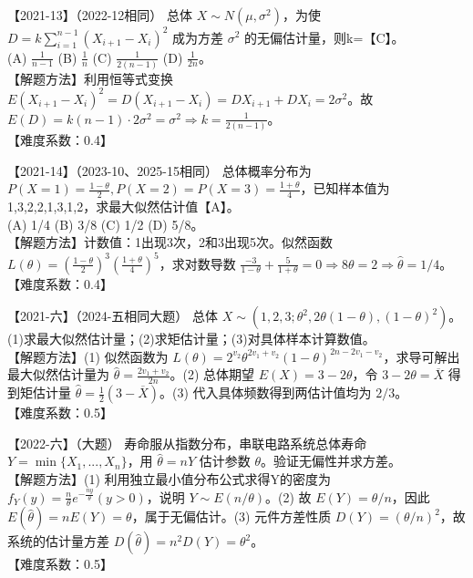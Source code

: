 \documentclass[zihao=4, a4paper, fontset=mac]{ctexart}
\begin{document}
【2021-13】（2022-12相同） 总体 $X\sim N(\mu,\sigma^2)$，为使 $D=k\sum_{i=1}^{n-1}(X_{i+1}-X_i)^2$ 成为方差 $\sigma^2$ 的无偏估计量，则k=【C】。\\
(A) $\frac{1}{n-1}$ \quad (B) $\frac{1}{n}$ \quad (C) $\frac{1}{2(n-1)}$ \quad (D) $\frac{1}{2n}$。\\
【解题方法】利用恒等式变换 $E(X_{i+1}-X_i)^2 = D(X_{i+1}-X_i) = DX_{i+1}+DX_i = 2\sigma^2$。故 $E(D)=k(n-1)\cdot2\sigma^2 = \sigma^2 \Rightarrow k=\frac{1}{2(n-1)}$。\\
【难度系数：0.4】

\par\vspace{\baselineskip}

【2021-14】（2023-10、2025-15相同） 总体概率分布为 $P(X=1)=\frac{1-\theta}{2}, P(X=2)=P(X=3)=\frac{1+\theta}{4}$，已知样本值为1,3,2,2,1,3,1,2，求最大似然估计值【A】。\\
(A) 1/4 \quad (B) 3/8 \quad (C) 1/2 \quad (D) 5/8。\\
【解题方法】计数值：1出现3次，2和3出现5次。似然函数 $L(\theta)=(\frac{1-\theta}{2})^3(\frac{1+\theta}{4})^5$，求对数导数 $\frac{-3}{1-\theta}+\frac{5}{1+\theta}=0 \Rightarrow 8\theta=2 \Rightarrow \widehat{\theta}=1/4$。\\
【难度系数：0.4】

\par\vspace{\baselineskip}

【2021-六】（2024-五相同大题） 总体 $X\sim (1,2,3; \theta^2, 2\theta(1-\theta), (1-\theta)^2)$。(1)求最大似然估计量；(2)求矩估计量；(3)对具体样本计算数值。\\
【解题方法】(1) 似然函数为 $L(\theta)=2^{v_2}\theta^{2v_1+v_2}(1-\theta)^{2n-2v_1-v_2}$，求导可解出最大似然估计量为 $\widehat{\theta}=\frac{2v_1+v_2}{2n}$。(2) 总体期望 $E(X)=3-2\theta$，令 $3-2\theta = \overline{X}$ 得到矩估计量 $\widehat{\theta}=\frac{1}{2}(3-\overline{X})$。(3) 代入具体频数得到两估计值均为 $2/3$。\\
【难度系数：0.5】

\par\vspace{\baselineskip}

【2022-六】（大题） 寿命服从指数分布，串联电路系统总体寿命 $Y = \min\{X_1,...,X_n\}$，用 $\widehat{\theta}=nY$ 估计参数 $\theta$。验证无偏性并求方差。\\
【解题方法】(1) 利用独立最小值分布公式求得Y的密度为 $f_Y(y)=\frac{n}{\theta}e^{-\frac{ny}{\theta}} (y>0)$，说明 $Y\sim E(n/\theta)$。(2) 故 $E(Y)=\theta/n$，因此 $E(\widehat{\theta})=nE(Y)=\theta$，属于无偏估计。(3) 元件方差性质 $D(Y)=(\theta/n)^2$，故系统的估计量方差 $D(\widehat{\theta})=n^2 D(Y)=\theta^2$。\\
【难度系数：0.5】
\end{document}

